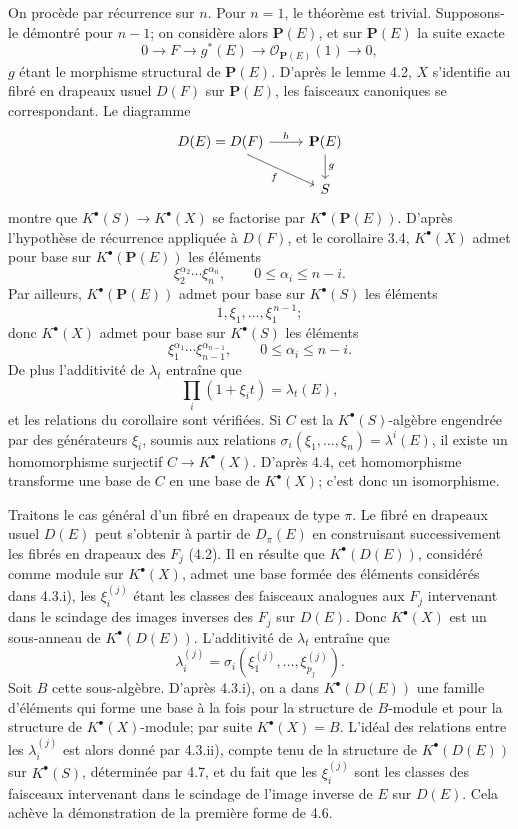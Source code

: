 \documentclass[11pt]{article}
\begin{document}
On procède par récurrence sur \(n\). Pour \(n=1\), le théorème est trivial. Supposons-le démontré pour \(n-1\); on considère alors \(\mathbf P(E)\), et sur \(\mathbf P(E)\) la suite exacte
\[
  0\longrightarrow F\longrightarrow g^*(E)\longrightarrow \mathcal O_{\mathbf P(E)}(1)\longrightarrow 0,
\]
\(g\) étant le morphisme structural de \(\mathbf P(E)\). D'après le lemme 4.2, \(X\) s'identifie au fibré en drapeaux usuel \(D(F)\) sur \(\mathbf P(E)\), les faisceaux canoniques se correspondant. Le diagramme
\[
\begin{tikzcd}
D(E)=D(F) \arrow[r,"h"] \arrow[dr,"f"'] & \mathbf P(E) \arrow[d,"g"]\\
& S
\end{tikzcd}
\]
montre que \(K^\bullet(S)\to K^\bullet(X)\) se factorise par \(K^\bullet(\mathbf P(E))\). D'après l'hypothèse de récurrence appliquée à \(D(F)\), et le corollaire 3.4, \(K^\bullet(X)\) admet pour base sur \(K^\bullet(\mathbf P(E))\) les éléments
\[
  \xi_2^{\alpha_2}\cdots\xi_n^{\alpha_n},
  \qquad 0\leq\alpha_i\leq n-i.
\]
Par ailleurs, \(K^\bullet(\mathbf P(E))\) admet pour base sur \(K^\bullet(S)\) les éléments
\[
  1,\xi_1,\ldots,\xi_1^{\,n-1};
\]
donc \(K^\bullet(X)\) admet pour base sur \(K^\bullet(S)\) les éléments
\[
  \xi_1^{\alpha_1}\cdots\xi_{n-1}^{\alpha_{n-1}},
  \qquad 0\leq\alpha_i\leq n-i.
\]
De plus l'additivité de \(\lambda_t\) entraîne que
\[
  \prod_i(1+\xi_i t)=\lambda_t(E),
\]
et les relations du corollaire sont vérifiées. Si \(C\) est la \(K^\bullet(S)\)-algèbre engendrée par des générateurs \(\xi_i\), soumis aux relations \(\sigma_i(\xi_1,\ldots,\xi_n)=\lambda^i(E)\), il existe un homomorphisme surjectif \(C\to K^\bullet(X)\). D'après 4.4, cet homomorphisme transforme une base de \(C\) en une base de \(K^\bullet(X)\); c'est donc un isomorphisme.

Traitons le cas général d'un fibré en drapeaux de type \(\pi\). Le fibré en drapeaux usuel \(D(E)\) peut s'obtenir à partir de \(D_\pi(E)\) en construisant successivement les fibrés en drapeaux des \(F_j\) (4.2). Il en résulte que \(K^\bullet(D(E))\), considéré comme module sur \(K^\bullet(X)\), admet une base formée des éléments considérés dans 4.3.i), les \(\xi_i^{(j)}\) étant les classes des faisceaux analogues aux \(F_j\) intervenant dans le scindage des images inverses des \(F_j\) sur \(D(E)\). Donc \(K^\bullet(X)\) est un sous-anneau de \(K^\bullet(D(E))\). L'additivité de \(\lambda_t\) entraîne que
\[
  \lambda_i^{(j)}=\sigma_i(\xi_1^{(j)},\ldots,\xi_{p_j}^{(j)}).
\]
Soit \(B\) cette sous-algèbre. D'après 4.3.i), on a dans \(K^\bullet(D(E))\) une famille d'éléments qui forme une base à la fois pour la structure de \(B\)-module et pour la structure de \(K^\bullet(X)\)-module; par suite \(K^\bullet(X)=B\). L'idéal des relations entre les \(\lambda_i^{(j)}\) est alors donné par 4.3.ii), compte tenu de la structure de \(K^\bullet(D(E))\) sur \(K^\bullet(S)\), déterminée par 4.7, et du fait que les \(\xi_i^{(j)}\) sont les classes des faisceaux intervenant dans le scindage de l'image inverse de \(E\) sur \(D(E)\). Cela achève la démonstration de la première forme de 4.6.
\end{document}
